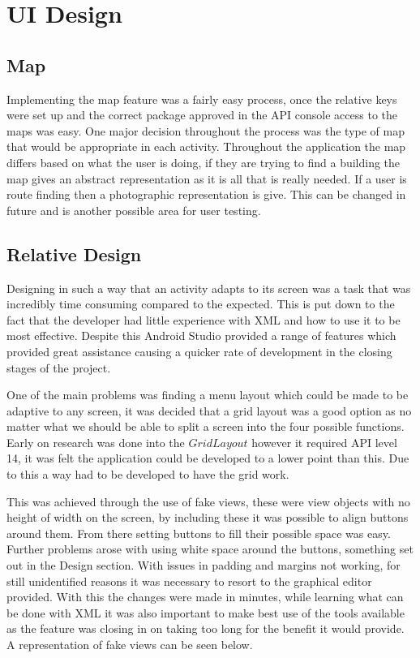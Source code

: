 \section{UI Design}

\subsection{Map}

Implementing the map feature was a fairly easy process, once the relative keys were set up and the correct package approved in the API console access to the maps was easy. One major decision throughout the process was the type of map that would be appropriate in each activity. Throughout the application the map differs based on what the user is doing, if they are trying to find a building the map gives an abstract representation as it is all that is really needed. If a user is route finding then a photographic representation is give. This can be changed in future and is another possible area for user testing. 

\subsection{Relative Design}
Designing in such a way that an activity adapts to its screen was a task that was incredibly time consuming compared to the expected. This is put down to the fact that the developer had little experience with XML and how to use it to be most effective. Despite this Android Studio provided a range of features which provided great assistance causing a quicker rate of development in the closing stages of the project.

One of the main problems was finding a menu layout which could be made to be adaptive to any screen, it was decided that a grid layout was a good option as no matter what we should be able to split a screen into the four possible functions. Early on research was done into the $GridLayout$ however it required API level 14, it was felt the application could be developed to a lower point than this. Due to this a way had to be developed to have the grid work.

This was achieved through the use of fake views, these were view objects with no height of width on the screen, by including these it was possible to align buttons around them. From there setting buttons to fill their possible space was easy. Further problems arose with using white space around the buttons, something set out in the Design section. With issues in padding and margins not working, for still unidentified reasons it was necessary to resort to the graphical editor provided. With this the changes were made in minutes, while learning what can be done with  XML it was also important to make best use of the tools available as the feature was closing in on taking too long for the benefit it would provide. A representation of fake views can be seen below. 

